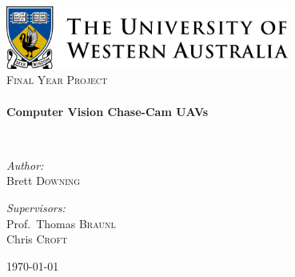 
\begin{titlepage}
\begin{center}

\includegraphics[width=0.7\textwidth]{./logo.png}~\\[1cm]

\textsc{\Large Final Year Project}\\[0.5cm]

\HRule \\[0.4cm]
{ \huge \bfseries Computer Vision Chase-Cam UAVs\\[0.4cm] }

\HRule \\[1.5cm]

\noindent
\begin{minipage}[t]{0.4\textwidth}
\begin{flushleft} \large
\emph{Author:}\\
Brett \textsc{Downing}
\end{flushleft}
\end{minipage}%
\begin{minipage}[t]{0.4\textwidth}
\begin{flushright} \large
\emph{Supervisors:} \\
Prof.~Thomas \textsc{Braunl}\\
Chris \textsc{Croft}
\end{flushright}
\end{minipage}

\vfill

{\large \today}

\end{center}
\end{titlepage}